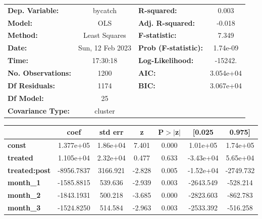 \begin{center}
\begin{tabular}{lclc}
\toprule
\textbf{Dep. Variable:}    &     bycatch      & \textbf{  R-squared:         } &     0.003   \\
\textbf{Model:}            &       OLS        & \textbf{  Adj. R-squared:    } &    -0.018   \\
\textbf{Method:}           &  Least Squares   & \textbf{  F-statistic:       } &     7.349   \\
\textbf{Date:}             & Sun, 12 Feb 2023 & \textbf{  Prob (F-statistic):} &  1.74e-09   \\
\textbf{Time:}             &     17:30:18     & \textbf{  Log-Likelihood:    } &   -15242.   \\
\textbf{No. Observations:} &        1200      & \textbf{  AIC:               } & 3.054e+04   \\
\textbf{Df Residuals:}     &        1174      & \textbf{  BIC:               } & 3.067e+04   \\
\textbf{Df Model:}         &          25      & \textbf{                     } &             \\
\textbf{Covariance Type:}  &     cluster      & \textbf{                     } &             \\
\bottomrule
\end{tabular}
\begin{tabular}{lcccccc}
                      & \textbf{coef} & \textbf{std err} & \textbf{z} & \textbf{P$> |$z$|$} & \textbf{[0.025} & \textbf{0.975]}  \\
\midrule
\textbf{const}        &    1.377e+05  &     1.86e+04     &     7.401  &         0.000        &     1.01e+05    &     1.74e+05     \\
\textbf{treated}      &    1.105e+04  &     2.32e+04     &     0.477  &         0.633        &    -3.43e+04    &     5.65e+04     \\
\textbf{treated:post} &   -8956.7837  &     3166.921     &    -2.828  &         0.005        &    -1.52e+04    &    -2749.732     \\
\textbf{month\_1}     &   -1585.8815  &      539.636     &    -2.939  &         0.003        &    -2643.549    &     -528.214     \\
\textbf{month\_2}     &   -1843.1931  &      500.218     &    -3.685  &         0.000        &    -2823.603    &     -862.783     \\
\textbf{month\_3}     &   -1524.8250  &      514.584     &    -2.963  &         0.003        &    -2533.392    &     -516.258     \\

\end{tabular}
\end{center}
